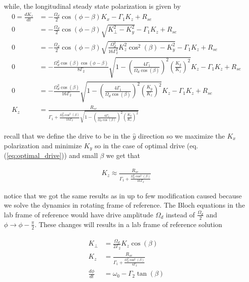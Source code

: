 \documentclass{article}
\begin{document}
while, the longitudinal steady state polarization is given by
\begin{align}
      0=\frac{d K_z}{dt} &=  -\frac{\Omega_d}{2} \cos{\left(\phi-\beta\right)}K_x - \Gamma_1 K_z + R_{se}\\
      0 &=  -\frac{\Omega_d}{2} \cos{\left(\phi-\beta\right)}\sqrt{K_{\perp}^2-K_y^2} - \Gamma_1 K_z + R_{se}\\
      0 &=  -\frac{\Omega_d}{2} \cos{\left(\phi-\beta\right)}\sqrt{\frac{\Omega_d^2}{16\Gamma_2^2} K_z^2 \cos^2{\left(\beta\right)}-K_y^2} - \Gamma_1 K_z + R_{se}\\
      0 &=  -\frac{\Omega_d^2\cos{\left(\beta\right)}\cos{\left(\phi-\beta\right)}}{8\Gamma_2}\sqrt{1 - \left(\frac{4\Gamma_1}{\Omega_d \cos{\left(\beta\right)}}\right)^2\left(\frac{K_y}{K_z}\right)^2}K_z - \Gamma_1 K_z + R_{se}\\
      0 &=  -\frac{\Omega_d^2\cos{\left(\beta\right)}}{16\Gamma_2}\sqrt{1 - \left(\frac{4\Gamma_1}{\Omega_d \cos{\left(\beta\right)}}\right)^2\left(\frac{K_y}{K_z}\right)^2}K_z - \Gamma_1 K_z + R_{se}\\
      K_z &= \frac{R_{se}}{\Gamma_1 + \frac{\Omega_d^2\cos^2{\left(\beta\right)}}{16\Gamma_2}\sqrt{1 - \left(\frac{4\Gamma_1}{\Omega_d \cos{\left(\beta\right)}}\right)^2\left(\frac{K_y}{K_z}\right)^2}}
\end{align}

recall that we define the drive to be in the $\hat{y}$ direction so we maximize the $K_x$ polarization and minimize $K_y$ so in the case of optimal drive (eq.(\ref{eq:optimal_drive})) and small $\beta$ we get that

\begin{align}
      \boxed{K_z \approx \frac{R_{se}}{\Gamma_1 + \frac{\Omega_d^2\cos^2{\left(\beta\right)}}{16\Gamma_2}}}
\end{align}

notice that we got the same results as in \cite{walker2016spin} up to few modification caused because we solve the dynamics in rotating frame of reference. The Bloch equations in the lab frame of reference would have drive amplitude $\Omega_d$ instead of $\frac{\Omega_d}{2}$ and $\phi\to \phi - \frac{\pi}{2}$. These changes will results in a lab frame of reference solution 

\begin{align}
    \boxed{
    \begin{aligned}
       K_{\perp} &= \frac{\Omega_d}{2\Gamma_2} K_z \cos{\left(\beta\right)}\\
      K_z &= \frac{R_{se}}{\Gamma_1 + \frac{\Omega_d^2\cos^2{\left(\beta\right)}}{4\Gamma_2}}\\
      \frac{d \phi}{dt} &=  \omega_0 -\Gamma_2 \tan{\left(\beta\right)}
    \end{aligned}}\label{eq:lab-farame-solution}
\end{align}
\end{document}
